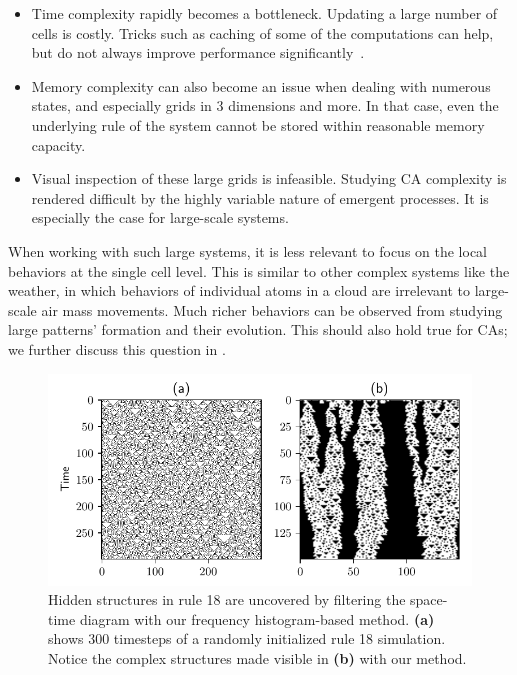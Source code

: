 \begin{itemize}
\item Time complexity rapidly becomes a bottleneck. Updating a large number of
  cells is costly. Tricks such as caching of some of the computations can help,
  but do not always improve performance
  significantly~\parencite{gosperExploitingRegularitiesLarge1984}.

\item Memory complexity can also become an issue when dealing with numerous
  states, and especially grids in 3 dimensions and more. In that case, even the
  underlying rule of the system cannot be stored within reasonable memory
  capacity.

\item Visual inspection of these large grids is infeasible. Studying CA
  complexity is rendered difficult by the highly variable nature of emergent
  processes. It is especially the case for large-scale systems.

\end{itemize}
When working with such large systems, it is less relevant to focus on the local
behaviors at the single cell level. This is similar to other complex systems
like the weather, in which behaviors of individual atoms in a cloud are
irrelevant to large-scale air mass movements. Much richer behaviors can be
observed from studying large patterns' formation and their evolution. This
should also hold true for CAs; we further discuss this question in
.

\begin{figure}[th]
  \centering
  \includegraphics[width=.93\linewidth]{figures/rule18_small.pdf}
  \caption{\label{fig:rule18_small} Hidden structures in rule 18 are uncovered
    by filtering the space-time diagram with our frequency histogram-based
    method. \textbf{(a)} shows 300 timesteps of a randomly initialized rule 18
    simulation. Notice the complex structures made visible in \textbf{(b)} with
    our method.}
\end{figure}

